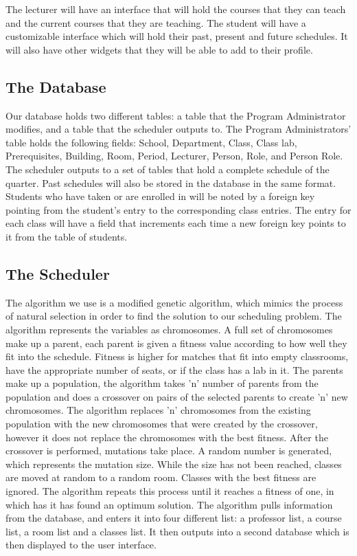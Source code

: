 \documentclass[12pt]{article}
\begin{document}
\begin{enumerate}
The lecturer will have an interface that will hold the courses that they can teach and the current courses that they are teaching. 
The student will have a customizable interface which will hold their past, present and future schedules. It will also have other widgets that they will be able to add to their profile.
\subsection{The Database}
Our database holds two different tables: a table that the Program Administrator modifies, and a table that the scheduler outputs to.
    The Program Administrators' table holds the following fields: School, Department, Class, Class lab, Prerequisites, Building, Room, Period, Lecturer, Person, Role, and Person Role.
	The scheduler outputs to a set of tables that hold a complete schedule of the quarter. Past schedules will also be stored in the database in the same format. Students who have taken or are enrolled in will be noted by a foreign key pointing from the student's entry to the corresponding class entries. The entry for each class will have a field that increments each time a new foreign key points to it from the table of students.


\subsection{The Scheduler}
The algorithm we use is a modified genetic algorithm, which mimics the process of natural selection in order to find the solution to our scheduling problem. The algorithm represents the variables as chromosomes. A full set of chromosomes make up a parent, each parent is given a fitness value according to how well they fit into the schedule. Fitness is higher for matches that fit into empty classrooms, have the appropriate number of seats, or if the class has a lab in it. The parents make up a population, the algorithm takes 'n' number of parents from the population and does a crossover on pairs of the selected parents to create 'n' new chromosomes. The algorithm replaces 'n' chromosomes from the existing population with the new chromosomes that were created by the crossover, however it does not replace the chromosomes with the best fitness. After the crossover is performed, mutations take place. A random number is generated, which represents the mutation size. While the size has not been reached, classes are moved at random to a random room. Classes with the best fitness are ignored. The algorithm repeats this process until it reaches a fitness of one, in which has it has found an optimum solution. The algorithm pulls information from the database, and enters it into four different list: a professor list, a course list, a room list and a classes list. It then outputs into a second database which is then displayed to the user interface.


\end{enumerate}
\end{document}
